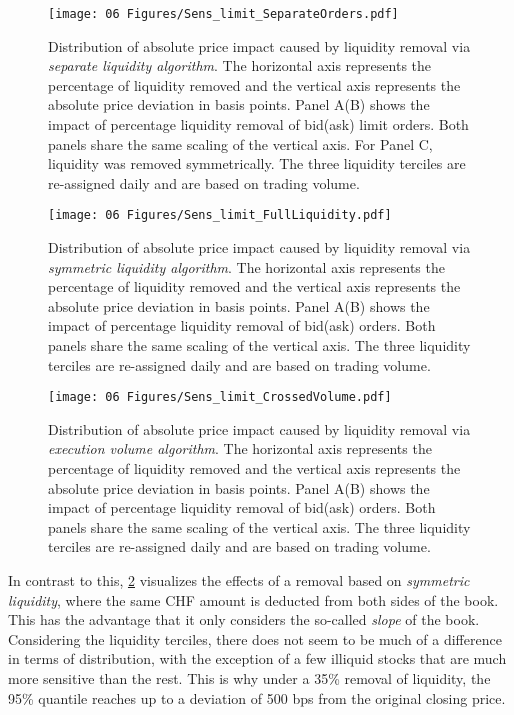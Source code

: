 \documentclass[11pt,a4paper, notitlepage]{article}
\begin{document}
	
	\begin{figure}[tp]
		\centering
		\texttt{[image: 06 Figures/Sens\_limit\_SeparateOrders.pdf]}
		\caption{Distribution of absolute price impact caused by liquidity removal via \textit{separate liquidity algorithm}. The horizontal axis represents the percentage of liquidity removed and the vertical axis represents the absolute price deviation in basis points. Panel A(B) shows the impact of percentage liquidity removal of bid(ask) limit orders. Both panels share the same scaling of the vertical axis. For Panel C, liquidity was removed symmetrically. The three liquidity terciles are re-assigned daily and are based on trading volume.}
		\label{fig:SensLimSeparate}
	\end{figure}
	
	\begin{figure}[tp]
		\centering
		\texttt{[image: 06 Figures/Sens\_limit\_FullLiquidity.pdf]}
		\caption{Distribution of absolute price impact caused by liquidity removal via \textit{symmetric liquidity algorithm}. The horizontal axis represents the percentage of liquidity removed and the vertical axis represents the absolute price deviation in basis points. Panel A(B) shows the impact of percentage liquidity removal of bid(ask) orders. Both panels share the same scaling of the vertical axis. The three liquidity terciles are re-assigned daily and are based on trading volume.}
		\label{fig:SensLimSymmetric}
	\end{figure}
	
	\begin{figure}[tp]
		\centering
		\texttt{[image: 06 Figures/Sens\_limit\_CrossedVolume.pdf]}
		\caption{Distribution of absolute price impact caused by liquidity removal via \textit{execution volume algorithm}. The horizontal axis represents the percentage of liquidity removed and the vertical axis represents the absolute price deviation in basis points. Panel A(B) shows the impact of percentage liquidity removal of bid(ask) orders. Both panels share the same scaling of the vertical axis. The three liquidity terciles are re-assigned daily and are based on trading volume.}	
		\label{fig:SensLimVolume}
	\end{figure}
	
	In contrast to this, \cref{fig:SensLimSymmetric} visualizes the effects of a removal based on \emph{symmetric liquidity}, where the same CHF amount is deducted from both sides of the book. This has the advantage that it only considers the so-called \emph{slope} of the book. Considering the liquidity terciles, there does not seem to be much of a difference in terms of distribution, with the exception of a few illiquid stocks that are much more sensitive than the rest. This is why under a 35\% removal of liquidity, the 95\% quantile reaches up to a deviation of 500 bps from the original closing price.
	
\end{document}
